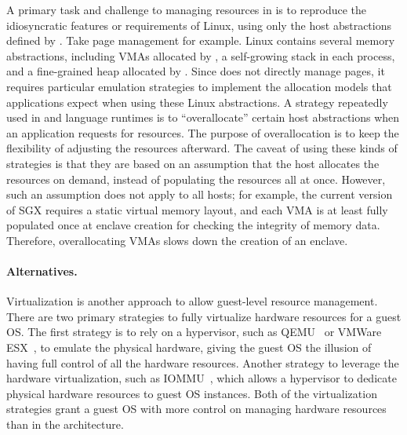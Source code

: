 A primary task and challenge to managing resources in \thelibos{}
is to reproduce the idiosyncratic %
features or requirements of Linux, %
using only the host abstractions
defined by \thehostabi{}.
Take page management for example.
Linux contains several memory abstractions, including VMAs allocated by , a self-growing stack in each process, and a fine-grained heap allocated by .
Since \thelibos{} does not directly manage pages,
it requires particular emulation strategies to
implement the allocation models that applications expect when using these Linux abstractions.
A strategy repeatedly used in \thelibos{} and language runtimes
is to ``overallocate'' certain host abstractions when an application requests for resources.
The purpose of overallocation is
to keep the flexibility of adjusting the resources afterward.
The caveat of using these kinds of strategies
is that they are based on an assumption that the host
allocates the resources
on demand, instead of populating the resources all at once.
However, such an assumption does not apply to all hosts;
for example, the current version of SGX requires a static virtual memory layout,
and each VMA is at least fully populated once at enclave creation
for checking the integrity of memory data.
Therefore, overallocating VMAs slows down the creation of an enclave.












\paragraph{Alternatives.}
Virtualization is another approach to allow guest-level resource management.
There are two primary strategies to fully virtualize hardware resources for a guest OS.
The first strategy is to rely on a hypervisor,
such as QEMU~\cite{qemu} or VMWare ESX~\cite{wldspurger02vmware-esx},
to emulate the physical hardware,
giving the guest OS the illusion of having full control of all the hardware resources.
Another strategy to leverage the hardware virtualization,
such as IOMMU~\cite{VT-d},
which allows a hypervisor to dedicate physical hardware resources
to guest OS instances.
Both of the virtualization strategies grant a guest OS with more control on managing hardware resources than \thelibos{} in the \graphene{} architecture.


